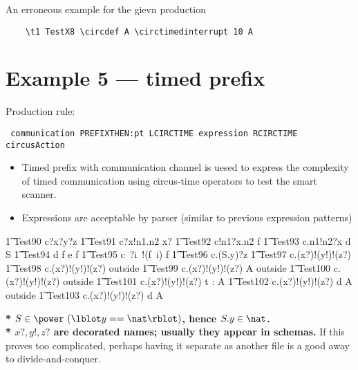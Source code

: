 \documentclass{article}
\begin{document}
An erroneous example for the gievn production 
\begin{verbatim}
	\t1 TestX8 \circdef A \circtimedinterrupt 10 A
\end{verbatim}
		
\section{Example 5 --- timed prefix}

Production rule:
\begin{verbatim}
 communication PREFIXTHEN:pt LCIRCTIME expression RCIRCTIME circusAction
\end{verbatim}

\begin{itemize}
	\item Timed prefix with communication channel is uesed to express the complexity of timed communication using circus-time operators to test the smart scanner.
	\item Expressions are acceptable by parser (similar to previous expression patterns)
\end{itemize}

%
\begin{circusaction}
   \t1 Test90 \circdef c?x?y?z  \Skip
   \also
   \t1 Test91 \circdef c?x!n1.n2 \then \lcirctime x? \rcirctime \Skip 
   \also
   \t1 Test92 \circdef c!n1?x.n2 \then \lcirctime f \rcirctime \Skip
   \also
   \t1 Test93 \circdef c.n1!n2?x \then {} \rcirctime d \then \lcirctime \theta S 
   \rcirctime \Skip 
   \also
   \t1 Test94 \circdef d \then \lcirctime f \rcirctime e \then \lcirctime f \rcirctime \Skip 
   \also
   \t1 Test95 \circdef c~?i~!(f~i) \then \lcirctime f \rcirctime \Skip
   \also
   \t1 Test96 \circdef c.(S.y)?z \then {} \rcirctime \Skip
   \also
   \t1 Test97 \circdef c.(x?)!(y!)!(z?) \then {} \rcirctime \Skip 
   \also
   \t1 Test98 \circdef c.(x?)!(y!)!(z?) \then {} \rcirctime \lcirctime outside 
   \rcirctime \circstartby \Skip 
   \also
   \t1 Test99 \circdef c.(x?)!(y!)!(z?) \then {} \rcirctime A \circendby \lcirctime 
   outside \rcirctime
   \also
   \t1 Test100 \circdef c.(x?)!(y!)!(z?) \then {} \rcirctime \circwait outside
   \also
   \t1 Test101 \circdef c.(x?)!(y!)!(z?) \then {} \rcirctime \circwait t : \nat 
   \circspot  A
   \also
   \t1 Test102 \circdef c.(x?)!(y!)!(z?) \then {} \rcirctime d \then A \circtimeout   
   {\lcirctime outside \rcirctime}  \Skip
   \also
   \t1 Test103 \circdef c.(x?)!(y!)!(z?) \then {} \rcirctime d \then {} 
   \rcirctime A  \Skip
\end{circusaction}     
%
\textbf{* $S \in \power~(\lblot y == \nat \rblot)$, hence $S.y \in \nat$.}
\\
\indent \textbf{* $x?, y!, z?$ are decorated names; usually they appear in schemas.}
%
If this proves too complicated, perhaps having it separate as another file 
is a good away to divide-and-conquer.
\end{document}

